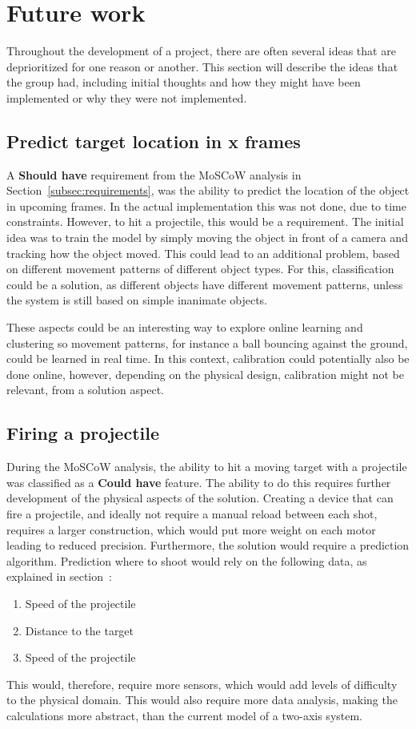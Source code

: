 \section{Future work}\label{sec:futurework}
Throughout the development of a project, there are often several ideas that are deprioritized for one reason or another.
This section will describe the ideas that the group had, including initial thoughts and how they might have been implemented or why they were not implemented.


\subsection{Predict target location in x frames}
A \textbf{Should have} requirement from the MoSCoW analysis in Section~\ref{subsec:requirements}, was the ability to predict the location of the object in upcoming frames.
In the actual implementation this was not done, due to time constraints.
However, to hit a projectile, this would be a requirement.
The initial idea was to train the model by simply moving the object in front of a camera and tracking how the object moved.
This could lead to an additional problem, based on different movement patterns of different object types.
For this, classification could be a solution, as different objects have different movement patterns, unless the system is still based on simple inanimate objects.

These aspects could be an interesting way to explore online learning and clustering so movement patterns, for instance a ball bouncing against the ground, could be learned in real time. 
In this context, calibration could potentially also be done online, however, depending on the physical design, calibration might not be relevant, from a solution aspect.



\subsection{Firing a projectile}
During the MoSCoW analysis, the ability to hit a moving target with a projectile was classified as a \textbf{Could have} feature.
The ability to do this requires further development of the physical aspects of the solution.
Creating a device that can fire a projectile, and ideally not require a manual reload between each shot, requires a larger construction, which would put more weight on each motor leading to reduced precision.
Furthermore, the solution would require a prediction algorithm.
Prediction where to shoot would rely on the following data, as explained in section~:
\begin{enumerate}
	\item Speed of the projectile
	\item Distance to the target
	\item Speed of the projectile
\end{enumerate}
This would, therefore, require more sensors, which would add levels of difficulty to the physical domain.
This would also require more data analysis, making the calculations more abstract, than the current model of a two-axis system.


